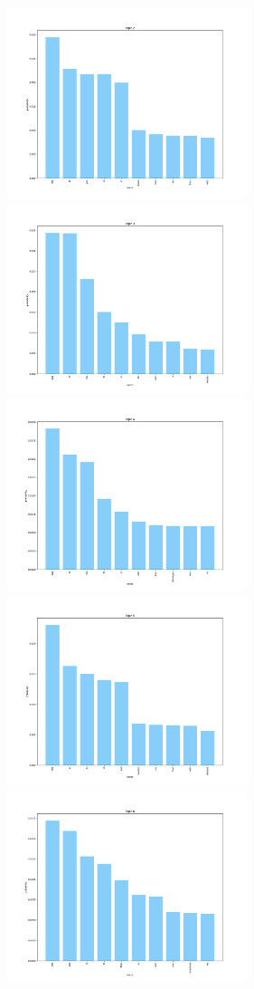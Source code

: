 \documentclass[10pt]{article} %
\begin{document}
	\begin{figure}[H]
		\centering
		\includegraphics[width=7cm]{images/plots/test_5/topic_2.png}
		\includegraphics[width=7cm]{images/plots/test_5/topic_3.png}
		\includegraphics[width=7cm]{images/plots/test_5/topic_4.png}
		\includegraphics[width=7cm]{images/plots/test_5/topic_5.png}
		\includegraphics[width=7cm]{images/plots/test_5/topic_6.png}

\end{figure}
\end{document}
